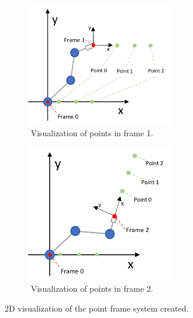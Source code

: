 \begin{figure}[ht]
    \centering
    \begin{subfigure}[b]{0.3\textwidth}
        \centering
        \includegraphics[width=6.5cm]{img/point_frame_explanation1.png}
        \caption{$ $ Visualization of points in frame 1.}
        \label{fig:kin__PF1}
    \end{subfigure}
    \hspace{3cm}
    \begin{subfigure}[b]{0.3\textwidth}
        \centering
        \includegraphics[width=6.5cm]{img/point_frame_explanation2.png}
        \caption{$ $ Visualization of points in frame 2.}
        \label{fig:kim__PF2}
    \end{subfigure}
       \caption{2D visualization of the point frame system created.}
       \label{fig:kin_point_frame_explanation}
\end{figure}


